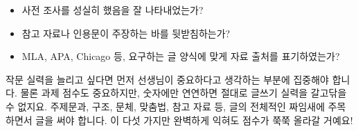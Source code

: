 \documentclass{translation}
\begin{document}
\begin{itemize}
\item 사전 조사를 성실히 했음을 잘 나타내었는가?
\item 참고 자료나 인용문이 주장하는 바를 뒷받침하는가?
\item MLA, APA, Chicago 등, 요구하는 글 양식에 맞게 자료 출처를 표기하였는가?
\end{itemize}

\hfill

작문 실력을 늘리고 싶다면 먼저
선생님이 중요하다고 생각하는 부분에 집중해야 합니다.
물론 과제 점수도 중요하지만, 숫자에만 연연하면 절대로 글쓰기 실력을 갈고닦을 수 없지요.
주제문과, 구조, 문체, 맞춤법, 참고 자료 등, 글의 전체적인 짜임새에 주목하면서 글을 써야 합니다.
이 다섯 가지만 완벽하게 익혀도 점수가 쭉쭉 올라갈 거예요!
\end{document}
